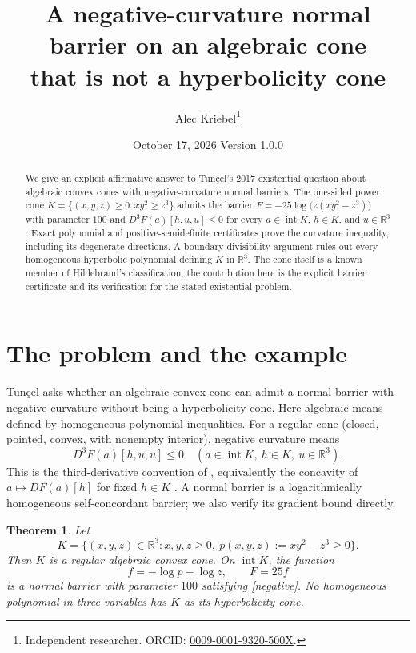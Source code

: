 \documentclass[11pt]{article}
\title{A negative-curvature normal barrier on an algebraic cone\protect\\that is not a hyperbolicity cone}
\author{Alec Kriebel\thanks{Independent researcher. ORCID: \href{https://orcid.org/0009-0001-9320-500X}{0009-0001-9320-500X}.}}
\date{October 17, 2026 \quad Version 1.0.0}
\newtheorem{theorem}{Theorem}
\newcommand{\R}{\mathbb R}
\newcommand{\inter}{\operatorname{int}}
\begin{document}
\maketitle
\begin{abstract}
We give an explicit affirmative answer to Tun\c{c}el's 2017 existential
question about algebraic convex cones with negative-curvature normal
barriers. The one-sided power cone
$K=\{(x,y,z)\geq0:xy^2\geq z^3\}$ admits the barrier
$F=-25\log\bigl(z(xy^2-z^3)\bigr)$ with parameter $100$ and
$D^3F(a)[h,u,u]\leq0$ for every $a\in\inter K$, $h\in K$, and
$u\in\R^3$. Exact polynomial and positive-semidefinite certificates prove
the curvature inequality, including its degenerate directions. A boundary
divisibility argument rules out every homogeneous hyperbolic polynomial
defining $K$ in $\R^3$. The cone itself is a known member of Hildebrand's
classification; the contribution here is the explicit barrier certificate
and its verification for the stated existential problem.
\end{abstract}

\section{The problem and the example}
Tun\c{c}el \cite[p.~799, Open Problem~1]{T} asks whether an algebraic convex
cone can admit a normal barrier with negative curvature without being a
hyperbolicity cone. Here algebraic means defined by homogeneous polynomial
inequalities. For a regular cone (closed, pointed, convex, with nonempty
interior), negative curvature means
\begin{equation}\label{negative}
 D^3F(a)[h,u,u]\leq0 \quad(a\in\inter K,\ h\in K,\ u\in\R^3).
\end{equation}
This is the third-derivative convention of \cite{T,NT}, equivalently the
concavity of $a\mapsto DF(a)[h]$ for fixed $h\in K$ \cite[Definition~3.1]{DTV}.
A normal barrier is a logarithmically homogeneous self-concordant barrier;
we also verify its gradient bound directly.

\begin{theorem}\label{main}
Let
\[
 K=\{(x,y,z)\in\R^3:x,y,z\geq0,\ p(x,y,z):=xy^2-z^3\geq0\}.
\]
Then $K$ is a regular algebraic convex cone. On $\inter K$, the function
\[
 f=-\log p-\log z,\qquad F=25f
\]
is a normal barrier with parameter $100$ satisfying \eqref{negative}.
No homogeneous polynomial in three variables has $K$ as its
hyperbolicity cone.
\end{theorem}
\end{document}
